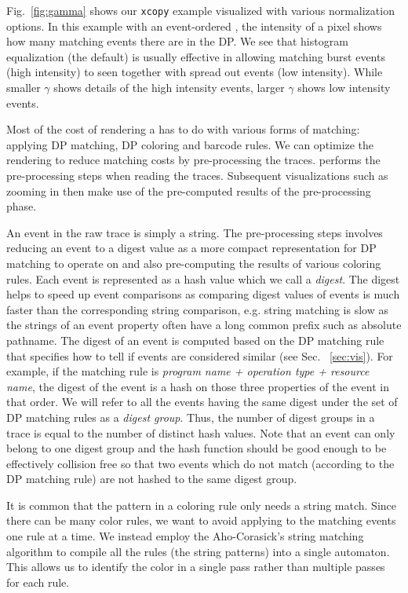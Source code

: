Fig.~\ref{fig:gamma} shows our {\tt xcopy} example visualized
with various normalization options.
In this example with an event-ordered \VDP,
the intensity of a pixel shows how many matching events there are in the DP.
We see that histogram equalization (the default) is usually effective
in allowing matching burst events (high intensity) to seen together
with spread out events (low intensity).
While smaller $\gamma$ shows details of the high intensity events,
larger $\gamma$ shows low intensity events.

Most of the cost of rendering a \VDP{} has to do with various forms of
matching: applying DP matching, DP coloring and barcode rules.
We can optimize the rendering to reduce matching costs by pre-processing
the traces. \lviz{} performs the pre-processing steps when reading the
traces. Subsequent visualizations such as zooming in then make use of
the pre-computed results of the pre-processing phase.

An event in the raw trace is simply a string.
The pre-processing steps involves reducing an event to
a digest value as a more compact representation for DP matching
to operate on and also pre-computing the
results of various coloring rules.
Each event is represented as a hash value which we call a {\em digest}.
The digest helps to speed up event comparisons
as comparing digest values of events is much faster than
the corresponding string comparison, e.g. string matching is slow
as the strings of an event property often have a long common prefix such
as absolute pathname.
The digest of an event is computed based on the DP matching rule that specifies
how to tell if events are considered similar (see Sec. ~\ref{sec:vis}).
For example, if the matching rule is 
{\em program name + operation type + resource name}, the digest
of the event is a hash on those three properties of the event in that order.
We will refer to all the events having the same digest under
the set of DP matching rules as a {\em digest group}.
Thus, the number of digest groups in a trace is equal to the number of distinct hash values.
Note that an event can only belong to one digest group and the hash function
should be good enough to be effectively collision free so that 
two events which do not match (according to the DP matching rule) are
not hashed to the same digest group.

It is common that the pattern in a coloring rule only needs a string
match.
Since there can be many color rules, we want to avoid applying
to the matching events one rule at a time.
We instead employ the Aho-Corasick's string matching algorithm \cite{aho1975efficient}
to compile all the rules (the string patterns) into a single automaton.
This allows us to identify the color in a single pass
rather than multiple passes for each rule.

